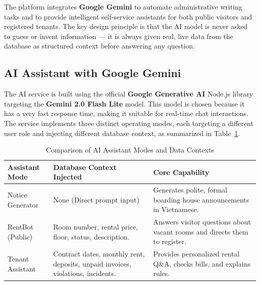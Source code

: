 The platform integrates \textbf{Google Gemini} to automate administrative writing tasks and to provide intelligent self-service assistants for both public visitors and registered tenants. The key design principle is that the AI model is never asked to guess or invent information — it is always given real, live data from the database as structured context before answering any question.

\subsection{AI Assistant with Google Gemini}

The AI service is built using the official \textbf{Google Generative AI} Node.js library targeting the \textbf{Gemini 2.0 Flash Lite} model. This model is chosen because it has a very fast response time, making it suitable for real-time chat interactions. The service implements three distinct operating modes, each targeting a different user role and injecting different database context, as summarized in Table~\ref{tab:ai_modes}.

\begin{table}[H]
    \centering
    \renewcommand{\arraystretch}{1.2}
    \begin{tabular}{|p{3cm}|p{3.5cm}|p{6.5cm}|}
        \hline
        \textbf{Assistant Mode} & \textbf{Database Context Injected} & \textbf{Core Capability} \\
        \hline
        Notice Generator & None (Direct prompt input) & Generates polite, formal boarding house announcements in Vietnamese. \\
        \hline
        RentBot (Public) & Room number, rental price, floor, status, description. & Answers visitor questions about vacant rooms and directs them to register. \\
        \hline
        Tenant Assistant & Contract dates, monthly rent, deposits, unpaid invoices, violations, incidents. & Provides personalized rental Q\&A, checks bills, and explains rules. \\
        \hline
    \end{tabular}
    \caption{Comparison of AI Assistant Modes and Data Contexts}
    \label{tab:ai_modes}
\end{table}

